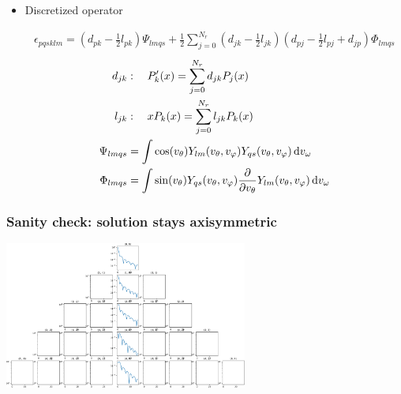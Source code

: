 \documentclass[mathserif, aspectratio=169]{beamer}
\newcommand{\ud}{\,\mathrm{d}}
\newcommand{\of}[1]{\mleft( #1 \mright)}
\newcommand{\vtheta}{v_{\theta}}
\newcommand{\vphi}{v_{\varphi}}
\newcommand{\vomega}{v_{\omega}}
\begin{document}
\begin{frame}
\begin{itemize}

\item Discretized operator

\begin{align*}
\epsilon_{pqsklm} =
\left( d_{pk} - \frac12 l_{pk}\right) \Psi_{lmqs}
+
\frac12
\sum_{j=0}^{N_r} \left( d_{jk} - \frac12 l_{jk} \right)
\left(
d_{pj}
- 
\frac12 l_{pj}
+
d_{jp}
\right)
\Phi_{lmqs}
\end{align*}
\begin{align*}
d_{jk}&: \quad P^\prime_k\of{x} = \sum_{j=0}^{N_r} d_{jk} P_j\of{x}
\\
l_{jk}&: \quad x P_k\of{x} = \sum_{j=0}^{N_r} l_{jk} P_k\of{x}
\\
\Psi_{lmqs} &=
\int
\cos\of{\vtheta} 
Y_{lm}\of{\vtheta,\vphi}
Y_{qs}\of{\vtheta,\vphi}
\ud{\vomega}
\\
\Phi_{lmqs} &=
\int
\sin\of{\vtheta} 
Y_{qs}\of{\vtheta,\vphi}
\frac{\partial}{\partial \vtheta}
Y_{lm}\of{\vtheta,\vphi}
\ud{\vomega}
\end{align*}
\end{itemize}
%
\end{frame}

\begin{frame}
\frametitle{Sanity check: solution stays axisymmetric}
\begin{center}
\includegraphics[width=0.6\textwidth]{figures/advection_operator_sanity_check}
\end{center}
\end{frame}
\end{document}
